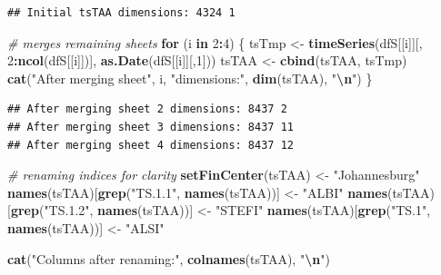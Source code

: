 \documentclass[
  12pt,
]{article}
\newenvironment{Shaded}{\begin{snugshade}}{\end{snugshade}}
\newcommand{\CommentTok}[1]{\textcolor[rgb]{0.56,0.35,0.01}{\textit{#1}}}
\newcommand{\ControlFlowTok}[1]{\textcolor[rgb]{0.13,0.29,0.53}{\textbf{#1}}}
\newcommand{\DecValTok}[1]{\textcolor[rgb]{0.00,0.00,0.81}{#1}}
\newcommand{\FunctionTok}[1]{\textcolor[rgb]{0.13,0.29,0.53}{\textbf{#1}}}
\newcommand{\NormalTok}[1]{#1}
\newcommand{\OtherTok}[1]{\textcolor[rgb]{0.56,0.35,0.01}{#1}}
\newcommand{\SpecialCharTok}[1]{\textcolor[rgb]{0.81,0.36,0.00}{\textbf{#1}}}
\newcommand{\StringTok}[1]{\textcolor[rgb]{0.31,0.60,0.02}{#1}}
\begin{document}
\begin{verbatim}
## Initial tsTAA dimensions: 4324 1
\end{verbatim}

\begin{Shaded}
\begin{Highlighting}[]
\CommentTok{\# merges remaining sheets}
\ControlFlowTok{for}\NormalTok{ (i }\ControlFlowTok{in} \DecValTok{2}\SpecialCharTok{:}\DecValTok{4}\NormalTok{) \{}
\NormalTok{  tsTmp }\OtherTok{\textless{}{-}} \FunctionTok{timeSeries}\NormalTok{(dfS[[i]][, }\DecValTok{2}\SpecialCharTok{:}\FunctionTok{ncol}\NormalTok{(dfS[[i]])], }\FunctionTok{as.Date}\NormalTok{(dfS[[i]][,}\DecValTok{1}\NormalTok{]))}
\NormalTok{  tsTAA }\OtherTok{\textless{}{-}} \FunctionTok{cbind}\NormalTok{(tsTAA, tsTmp)}
  \FunctionTok{cat}\NormalTok{(}\StringTok{"After merging sheet"}\NormalTok{, i, }\StringTok{"dimensions:"}\NormalTok{, }\FunctionTok{dim}\NormalTok{(tsTAA), }\StringTok{"}\SpecialCharTok{\textbackslash{}n}\StringTok{"}\NormalTok{)}
\NormalTok{\}}
\end{Highlighting}
\end{Shaded}

\begin{verbatim}
## After merging sheet 2 dimensions: 8437 2 
## After merging sheet 3 dimensions: 8437 11 
## After merging sheet 4 dimensions: 8437 12
\end{verbatim}

\begin{Shaded}
\begin{Highlighting}[]
\CommentTok{\# renaming indices for clarity}
\FunctionTok{setFinCenter}\NormalTok{(tsTAA) }\OtherTok{\textless{}{-}} \StringTok{"Johannesburg"}
\FunctionTok{names}\NormalTok{(tsTAA)[}\FunctionTok{grep}\NormalTok{(}\StringTok{"TS.1.1"}\NormalTok{, }\FunctionTok{names}\NormalTok{(tsTAA))] }\OtherTok{\textless{}{-}} \StringTok{"ALBI"}
\FunctionTok{names}\NormalTok{(tsTAA)[}\FunctionTok{grep}\NormalTok{(}\StringTok{"TS.1.2"}\NormalTok{, }\FunctionTok{names}\NormalTok{(tsTAA))] }\OtherTok{\textless{}{-}} \StringTok{"STEFI"}
\FunctionTok{names}\NormalTok{(tsTAA)[}\FunctionTok{grep}\NormalTok{(}\StringTok{"TS.1"}\NormalTok{, }\FunctionTok{names}\NormalTok{(tsTAA))] }\OtherTok{\textless{}{-}} \StringTok{"ALSI"}

\FunctionTok{cat}\NormalTok{(}\StringTok{"Columns after renaming:"}\NormalTok{, }\FunctionTok{colnames}\NormalTok{(tsTAA), }\StringTok{"}\SpecialCharTok{\textbackslash{}n}\StringTok{"}\NormalTok{)}
\end{Highlighting}
\end{Shaded}
\end{document}
